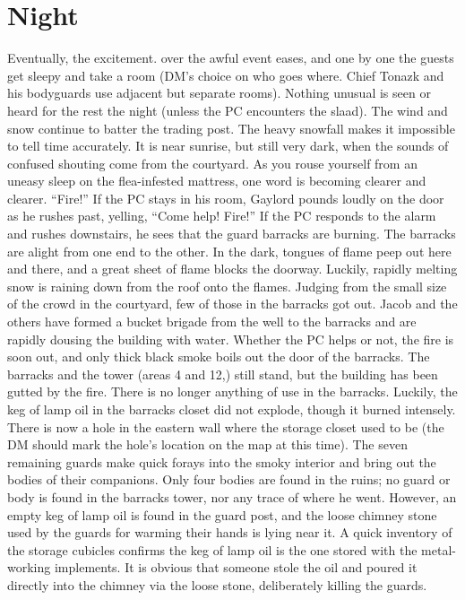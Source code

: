 \documentclass[a5paper,11pt,twoside]{book}
\begin{document}
{{{\section*{Night} Eventually, the excitement.
over the awful event eases, and one by one the guests get sleepy and take a room (DM’s choice on who goes where.
Chief Tonazk and his bodyguards use adjacent but separate rooms).
Nothing unusual is seen or heard for the rest the night (unless the PC encounters the slaad).
The wind and snow continue to batter the trading post.
The heavy snowfall makes it impossible to tell time accurately.
It is near sunrise, but still very dark, when the sounds of confused shouting come from the courtyard.
As you rouse yourself from an uneasy sleep on the flea-infested mattress, one word is becoming clearer and clearer.
“Fire!” If the PC stays in his room, Gaylord pounds loudly on the door as he rushes past, yelling, “Come help! Fire!” If the PC responds to the alarm and rushes downstairs, he sees that the guard barracks are burning.
The barracks are alight from one end to the other.
In the dark, tongues of flame peep out here and there, and a great sheet of flame blocks the doorway.
Luckily, rapidly melting snow is raining down from the roof onto the flames.
Judging from the small size of the crowd in the courtyard, few of those in the barracks got out.
Jacob and the others have formed a bucket brigade from the well to the barracks and are rapidly dousing the building with water.
Whether the PC helps or not, the fire is soon out, and only thick black smoke boils out the door of the barracks.
The barracks and the tower (areas 4 and 12,) still stand, but the building has been  gutted by the fire.
There is no longer anything of use in the barracks.
Luckily, the keg of lamp oil in the barracks closet did not explode, though it burned intensely.
There is now a hole in the eastern wall where the storage closet used to be (the DM should mark the hole’s location on the map at this time).
The seven remaining guards make quick forays into the smoky interior and bring out the bodies of their companions.
Only four bodies are found in the ruins; no guard or body is found in the barracks tower, nor any trace of where he went.
However, an empty keg of lamp oil is found in the guard post, and the loose chimney stone used by the guards for warming their hands is lying near it.
A quick inventory of the storage cubicles confirms the keg of lamp oil is the one stored with the metal-working implements.
It is obvious that someone stole the oil and poured it directly into the chimney via the loose stone, deliberately killing the guards.
}}}
\end{document}
